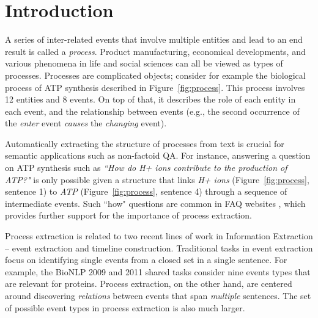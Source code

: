 \section{Introduction}

A series of inter-related events that involve multiple entities and lead to an end result is called a \emph{process}. Product manufacturing, economical developments, and various phenomena in life and social sciences can all be viewed as types of processes. Processes are complicated objects; consider for example the biological process of ATP synthesis described in Figure~\ref{fig:process}. This process involves 12 entities and 8 events. On top of that, it describes the role of each entity in each event, and the relationship between events (e.g., the second occurrence of the \textit{enter} event \textit{causes} the \textit{changing} event). 


Automatically extracting the structure of processes from text is crucial for semantic applications such as non-factoid QA. For instance, answering a question on ATP synthesis such as \emph{``How do H+ ions contribute to the production of ATP?"} is only possible given a structure that links \emph{H+ ions} (Figure~\ref{fig:process}, sentence 1) to \emph{ATP} (Figure~\ref{fig:process}, sentence 4) through a sequence of intermediate events. Such ``how" questions are common in FAQ websites \cite{Surdeanu:2011}, which provides further support for the importance of process extraction.



Process extraction is related to two recent lines of work in Information Extraction -- event extraction and timeline construction.
Traditional tasks in event extraction focus on identifying single events from a closed set  in a single sentence. 
For example, the BioNLP 2009 and 2011 shared tasks \cite{kim09,kim11} consider nine events types that are relevant for proteins.
Process extraction, on the other hand, are centered around discovering \emph{relations} between events that span \emph{multiple} sentences. The set of possible event types in process extraction is also much larger.

